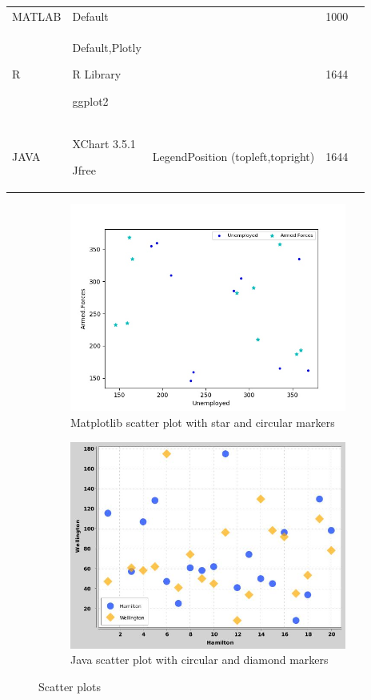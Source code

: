 \documentclass[12pt, a4paper,oneside]{report}
\begin{document}
\begin{table}[]
\begin{adjustbox}{width=\textwidth}
\begin{tabular}{|p{3cm}|p{3cm}|p{3cm}|p{2cm}|p{4cm}|}
				MATLAB   & Default &   & 1000  &  \\ \cline{0-3}
				
				R & Default,Plotly \par R Library \par ggplot2 &  & 1644  & \\ \cline{0-3}
				
				JAVA   & XChart 3.5.1 \par Jfree & LegendPosition (topleft,topright) & 1644 & \\ \hline
				
	\end{tabular}
		
\end{adjustbox}

\end{table}


\begin{figure}[!htbp]
	\begin{subfigure}{.5\textwidth}
		\centering
		\includegraphics[width=.8\linewidth]{scatter1}
		\caption{Matplotlib scatter plot with star and circular markers }
		\label{fig:fig1}
	\end{subfigure}%
	\begin{subfigure}{.5\textwidth}
		\centering
		\includegraphics[width=.8\linewidth]{scatter2}
		\caption{Java scatter plot with circular and diamond markers}
		\label{fig:fig2}
	\end{subfigure}
	\caption{Scatter plots}
	\label{fig:fig11}
\end{figure}
\end{document}
